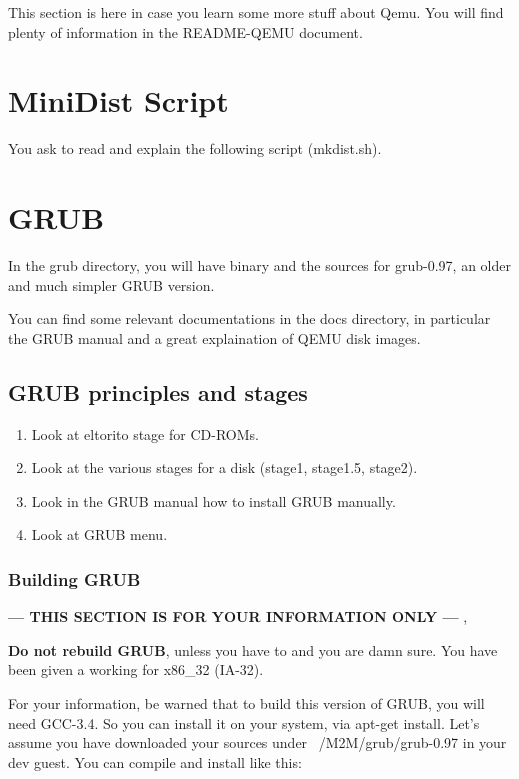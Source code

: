 \documentclass[10]{article}
\begin{document}
This section is here in case you learn some more stuff about Qemu.
You will find plenty of information in the README-QEMU document.

\section{MiniDist Script}

You ask to read and explain the following script (mkdist.sh).

\section{GRUB} 

In the grub directory, you will have binary and the sources for
grub-0.97, an older and much simpler GRUB version.

You can find some relevant documentations in the docs directory,
in particular the GRUB manual and a great explaination of QEMU disk
images.

\subsection{GRUB principles and stages}

\begin{enumerate}
\item
Look at eltorito stage for CD-ROMs.
\item
Look at the various stages for a disk (stage1, stage1.5, stage2).
\item
Look in the GRUB manual how to install GRUB manually.
\item 
Look at GRUB menu.
\end{enumerate}

\subsubsection{Building GRUB}

{\bf --- THIS SECTION IS FOR YOUR INFORMATION ONLY --- },

{\bf Do not rebuild GRUB}, unless you have to and you are damn sure. 
You have been given a working for x86\_32 (IA-32). 

For your information, be warned that to build this version of GRUB, 
you will need GCC-3.4. So you can install it on your system, via apt-get install.
Let's assume you have downloaded your sources under ~/M2M/grub/grub-0.97
in your dev guest. You can compile and install like this:
\end{document}
